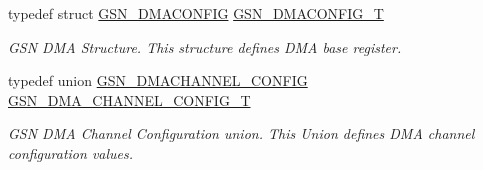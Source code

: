 \begin{DoxyCompactItemize}
typedef struct \hyperlink{a00053}{GSN\_\-DMACONFIG} \hyperlink{a00645_ga64a1083039794c33e6a904f799f730c5}{GSN\_\-DMACONFIG\_\-T}
\begin{DoxyCompactList}\small\item\em GSN DMA Structure. This structure defines DMA base register. \end{DoxyCompactList}\item 
typedef union \hyperlink{a00052}{GSN\_\-DMACHANNEL\_\-CONFIG} \hyperlink{a00645_ga39663b303d8a6ba93086369a284e1334}{GSN\_\-DMA\_\-CHANNEL\_\-CONFIG\_\-T}
\begin{DoxyCompactList}\small\item\em GSN DMA Channel Configuration union. This Union defines DMA channel configuration values. \end{DoxyCompactList}\end{DoxyCompactItemize}
